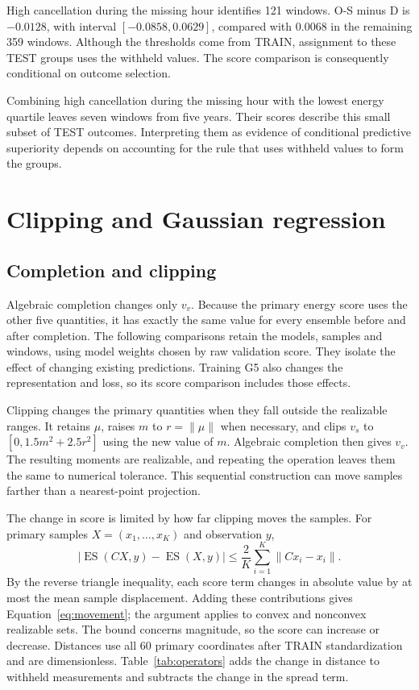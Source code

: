 \documentclass{article}
\begin{document}
High cancellation during the missing hour identifies 121 windows. O-S minus D is $-0.0128$, with interval $[-0.0858,0.0629]$, compared with $0.0068$ in the remaining 359 windows. Although the thresholds come from TRAIN, assignment to these TEST groups uses the withheld values. The score comparison is consequently conditional on outcome selection.

Combining high cancellation during the missing hour with the lowest energy quartile leaves seven windows from five years. Their scores describe this small subset of TEST outcomes. Interpreting them as evidence of conditional predictive superiority depends on accounting for the rule that uses withheld values to form the groups.

\section{Clipping and Gaussian regression}
\label{app:extension}

\subsection{Completion and clipping}

Algebraic completion changes only $v_v$. Because the primary energy score uses the other five quantities, it has exactly the same value for every ensemble before and after completion. The following comparisons retain the models, samples and windows, using model weights chosen by raw validation score. They isolate the effect of changing existing predictions. Training G5 also changes the representation and loss, so its score comparison includes those effects.

Clipping changes the primary quantities when they fall outside the realizable ranges. It retains $\mu$, raises $m$ to $r=\|\mu\|$ when necessary, and clips $v_s$ to $[0,1.5m^2+2.5r^2]$ using the new value of $m$. Algebraic completion then gives $v_v$. The resulting moments are realizable, and repeating the operation leaves them the same to numerical tolerance. This sequential construction can move samples farther than a nearest-point projection.

The change in score is limited by how far clipping moves the samples. For primary samples $X=(x_1,\ldots,x_K)$ and observation $y$,
\begin{equation}
 \left|\operatorname{ES}(CX,y)-\operatorname{ES}(X,y)\right|
 \le \frac{2}{K}\sum_{i=1}^K\|Cx_i-x_i\|.
 \label{eq:movement}
\end{equation}
By the reverse triangle inequality, each score term changes in absolute value by at most the mean sample displacement. Adding these contributions gives Equation~\ref{eq:movement}; the argument applies to convex and nonconvex realizable sets. The bound concerns magnitude, so the score can increase or decrease. Distances use all 60 primary coordinates after TRAIN standardization and are dimensionless. Table~\ref{tab:operators} adds the change in distance to withheld measurements and subtracts the change in the spread term.
\end{document}

